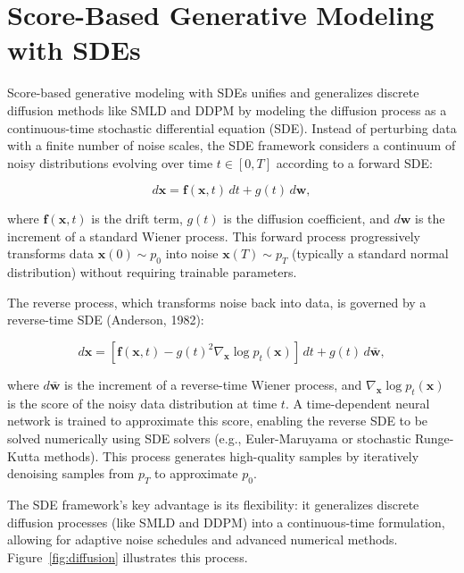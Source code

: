 \documentclass[12pt]{article}
\begin{document}
\section{Score-Based Generative Modeling with SDEs}

Score-based generative modeling with SDEs unifies and generalizes discrete diffusion methods like SMLD and DDPM by modeling the diffusion process as a continuous-time stochastic differential equation (SDE). Instead of perturbing data with a finite number of noise scales, the SDE framework considers a continuum of noisy distributions evolving over time $t \in [0, T]$ according to a forward SDE:

\begin{equation}
    d\mathbf{x} = \mathbf{f}(\mathbf{x}, t) \, dt + g(t) \, d\mathbf{w},
\end{equation}

where $\mathbf{f}(\mathbf{x}, t)$ is the drift term, $g(t)$ is the diffusion coefficient, and $d\mathbf{w}$ is the increment of a standard Wiener process. This forward process progressively transforms data $\mathbf{x}(0) \sim p_0$ into noise $\mathbf{x}(T) \sim p_T$ (typically a standard normal distribution) without requiring trainable parameters.

The reverse process, which transforms noise back into data, is governed by a reverse-time SDE (Anderson, 1982):

\begin{equation}
    d\mathbf{x} = \left[\mathbf{f}(\mathbf{x}, t) - g(t)^2 \nabla_{\mathbf{x}} \log p_t(\mathbf{x})\right] \, dt + g(t) \, d\bar{\mathbf{w}},
\end{equation}

where $d\bar{\mathbf{w}}$ is the increment of a reverse-time Wiener process, and $\nabla_{\mathbf{x}} \log p_t(\mathbf{x})$ is the score of the noisy data distribution at time $t$. A time-dependent neural network is trained to approximate this score, enabling the reverse SDE to be solved numerically using SDE solvers (e.g., Euler-Maruyama or stochastic Runge-Kutta methods). This process generates high-quality samples by iteratively denoising samples from $p_T$ to approximate $p_0$.

The SDE framework’s key advantage is its flexibility: it generalizes discrete diffusion processes (like SMLD and DDPM) into a continuous-time formulation, allowing for adaptive noise schedules and advanced numerical methods. Figure~\ref{fig:diffusion} illustrates this process.
\end{document}
